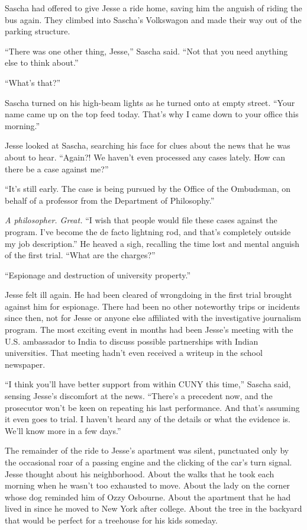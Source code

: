 \documentclass[12pt]{book}
\begin{document}
Sascha had offered to give Jesse a ride home, saving him the anguish of riding the bus again.  They climbed into Sascha's Volkswagon and made their way out of the parking structure.

``There was one other thing, Jesse,'' Sascha said.  ``Not that you need anything else to think about.''

``What's that?''

Sascha turned on his high-beam lights as he turned onto at empty street.  ``Your name came up on the top feed today.  That's why I came down to your office this morning.''

Jesse looked at Sascha, searching his face for clues about the news that he was about to hear.  ``Again?!  We haven't even processed any cases lately.  How can there be a case against me?''

``It's still early.  The case is being pursued by the Office of the Ombudsman, on behalf of a professor from the Department of Philosophy.''

\emph{A philosopher.  Great.}  ``I wish that people would file these cases against the program.  I've become the de facto lightning rod, and that's completely outside my job description.''  He heaved a sigh, recalling the time lost and mental anguish of the first trial.  ``What are the charges?''

``Espionage and destruction of university property.''

Jesse felt ill again.  He had been cleared of wrongdoing in the first trial brought against him for espionage.  There had been no other noteworthy trips or incidents since then, not for Jesse or anyone else affiliated with the investigative journalism program.  The most exciting event in months had been Jesse's meeting with the U.S. ambassador to India to discuss possible partnerships with Indian universities.  That meeting hadn't even received a writeup in the school newspaper.

``I think you'll have better support from within CUNY this time,'' Sascha said, sensing Jesse's discomfort at the news.  ``There's a precedent now, and the prosecutor won't be keen on repeating his last performance.  And that's assuming it even goes to trial.  I haven't heard any of the details or what the evidence is.  We'll know more in a few days.''

The remainder of the ride to Jesse's apartment was silent, punctuated only by the occasional roar of a passing engine and the clicking of the car's turn signal.  Jesse thought about his neighborhood.  About the walks that he took each morning when he wasn't too exhausted to move.  About the lady on the corner whose dog reminded him of Ozzy Osbourne.  About the apartment that he had lived in since he moved to New York after college.  About the tree in the backyard that would be perfect for a treehouse for his kids someday.
\end{document}
